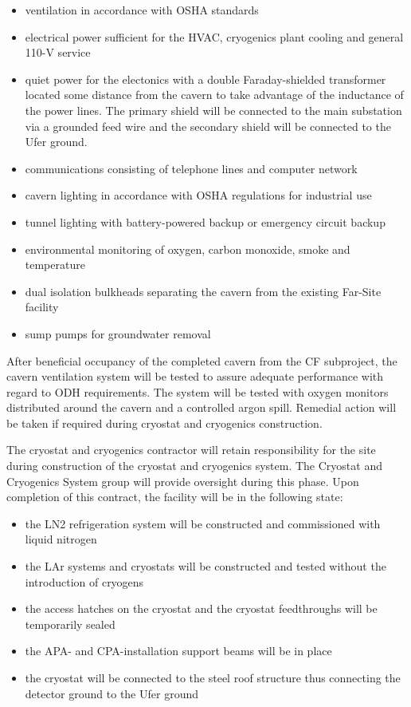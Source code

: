 \begin{itemize}
\item ventilation in accordance with OSHA standards
\item electrical power sufficient for the HVAC, cryogenics plant cooling and general 110-V service
\item quiet power for the electonics with a double Faraday-shielded transformer located some distance from the cavern to take advantage of the inductance of the power lines. The primary shield will be connected to the main substation via a grounded feed wire and the secondary shield will be connected to the Ufer ground.
\item communications consisting of telephone lines and computer network
\item cavern lighting in accordance with OSHA regulations for industrial use
\item tunnel lighting with battery-powered backup or emergency circuit backup
\item environmental monitoring of oxygen, carbon monoxide, smoke and temperature
\item dual isolation bulkheads separating the cavern from the existing Far-Site facility
\item sump pumps for groundwater removal
\end{itemize}

After beneficial occupancy of the completed cavern from the 
CF subproject, the cavern ventilation system will be tested to assure adequate performance with regard to ODH requirements. The system will be tested with oxygen monitors distributed around the cavern and a controlled argon spill. Remedial action will be taken if required during cryostat and cryogenics construction.

The cryostat and cryogenics contractor will retain responsibility for the site during construction of the cryostat and cryogenics system. The Cryostat and Cryogenics System group will provide oversight during this phase. Upon completion of this contract, the facility will be in the following state:

\begin{itemize}
\item the LN2 refrigeration system will be constructed and commissioned with liquid nitrogen
\item the LAr systems and cryostats will be constructed and tested without the introduction of cryogens \item the access hatches on the cryostat and the cryostat feedthroughs will be temporarily sealed
\item the APA- and CPA-installation support beams will be in place
\item the cryostat will be connected to the steel roof structure thus connecting the detector ground to the Ufer ground
\end{itemize}

